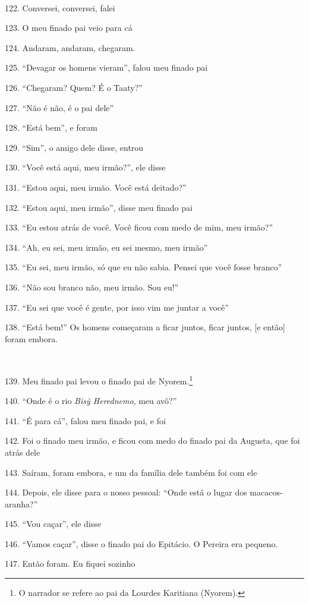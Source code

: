 ~

122. Conversei, conversei, falei

123. O meu finado pai veio para cá

124. Andaram, andaram, chegaram.

125. ``Devagar os homens vieram'', falou meu finado pai

126. ``Chegaram? Quem? É o Taaty?''

127. ``Não é não, é o pai dele''

128. ``Está bem'', e foram

129. ``Sim'', o amigo dele disse, entrou

130. ``Você está aqui, meu irmão?'', ele disse

131. ``Estou aqui, meu irmão. Você está deitado?''

132. ``Estou aqui, meu irmão'', disse meu finado pai

133. ``Eu estou atrás de você. Você ficou com medo de mim, meu irmão?''

134. ``Ah, eu sei, meu irmão, eu sei mesmo, meu irmão''

135. ``Eu sei, meu irmão, só que eu não sabia. Pensei que você fosse branco''

136. ``Não sou branco não, meu irmão. Sou eu!''

137. ``Eu sei que você é gente, por isso vim me juntar a você''

138. ``Está bem!'' Os homens começaram a ficar juntos, ficar juntos, {[}e então{]} foram embora.

~

139. Meu finado pai levou o finado pai de Nyorem.\footnote{O narrador se
  refere ao pai da Lourdes Karitiana (Nyorem).}

140. ``Onde é o rio \emph{Bisỹ Herednemo}, meu avô?''

141. ``É para cá'', falou meu finado pai, e foi

142. Foi o finado meu irmão, e ficou com medo do finado pai da Augusta,
que foi atrás dele

143. Saíram, foram embora, e um da família dele também foi com ele

144. Depois, ele disse para o nosso pessoal: ``Onde está o lugar dos
macacos- aranha?''

145. ``Vou caçar'', ele disse

146. ``Vamos caçar'', disse o finado pai do Epitácio. O Pereira era pequeno.

147. Então foram. Eu fiquei sozinho

